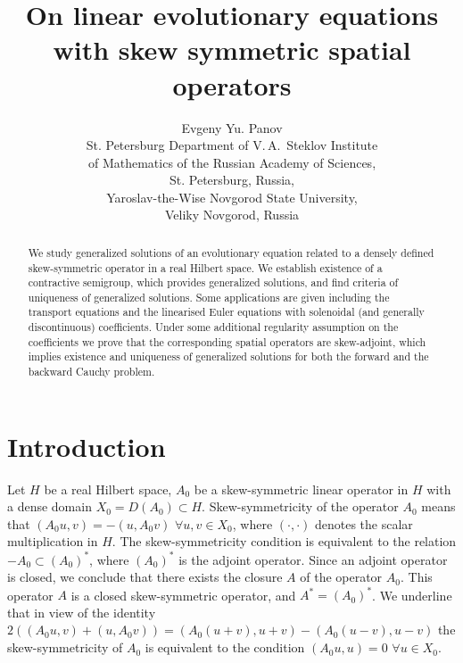 \documentclass[12pt]{article}
\date{}
\numberwithin{equation}{section}
\theoremstyle{plain}
\theoremstyle{definition}
\begin{document}
\title{On linear evolutionary equations with skew symmetric spatial operators}
\author{Evgeny Yu. Panov \\ St. Petersburg Department of V.\,A.~Steklov Institute \\ of Mathematics of the Russian Academy of Sciences, \\
St. Petersburg, Russia, \\ Yaroslav-the-Wise Novgorod State University,\\ Veliky Novgorod, Russia}
\maketitle

\begin{abstract}
We study generalized solutions of an evolutionary equation related to a densely defined skew-symmetric operator in a real Hilbert space. We establish existence of a contractive semigroup, which provides generalized solutions, and find criteria of uniqueness of generalized solutions. Some applications are given including the transport equations and the linearised Euler equations with  solenoidal (and generally discontinuous) coefficients. Under some additional regularity assumption on the coefficients we prove that the corresponding spatial operators are skew-adjoint, which implies existence and uniqueness of generalized solutions for both the forward and the backward Cauchy problem.
\end{abstract}


\section{Introduction}

Let $H$ be a real Hilbert space, $A_0$ be a skew-symmetric linear operator in $H$ with a dense domain $X_0=D(A_0)\subset H$. Skew-symmetricity of the operator $A_0$ means that $(A_0u,v)=-(u,A_0v)$ $\forall u,v\in X_0$, where $(\cdot,\cdot)$ denotes the scalar multiplication in $H$. The skew-symmetricity condition is equivalent to the relation
$-A_0\subset (A_0)^*$, where $(A_0)^*$ is the adjoint operator. Since an adjoint operator is closed, we conclude that there exists the closure $A$ of the operator $A_0$. This operator $A$ is a closed skew-symmetric operator, and $A^*=(A_0)^*$.
We underline that in view of the identity $2((A_0u,v)+(u,A_0v))=(A_0(u+v),u+v)-(A_0(u-v),u-v)$ the skew-symmetricity of $A_0$ is equivalent to the condition $(A_0u,u)=0$ $\forall u\in X_0$.
\end{document}
